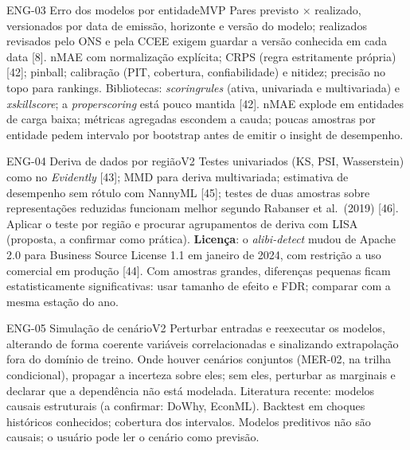 \begin{ficha}{ENG-03 \textperiodcentered{} Erro dos modelos por entidade}{MVP}
 Pares previsto × realizado, versionados por data de emissão,
horizonte e versão do modelo; realizados revisados pelo ONS e pela CCEE
exigem guardar a versão conhecida em cada data [8].
 nMAE com normalização explícita; CRPS (regra estritamente
própria) [42]; pinball; calibração (PIT, cobertura, confiabilidade) e
nitidez; precisão no topo para rankings. Bibliotecas: \emph{scoringrules}
(ativa, univariada e multivariada) e \emph{xskillscore}; a
\emph{properscoring} está pouco mantida [42].
 nMAE explode em entidades de carga baixa; métricas
agregadas escondem a cauda; poucas amostras por entidade pedem intervalo por
bootstrap antes de emitir o insight de desempenho.
\end{ficha}

\begin{ficha}{ENG-04 \textperiodcentered{} Deriva de dados por região}{V2}
 Testes univariados (KS, PSI, Wasserstein) como no
\emph{Evidently} [43]; MMD para deriva multivariada; estimativa de desempenho
sem rótulo com NannyML [45]; testes de duas amostras sobre representações
reduzidas funcionam melhor segundo Rabanser et al.\ (2019) [46]. Aplicar o
teste por região e procurar agrupamentos de deriva com LISA (proposta, a
confirmar como prática).
 \textbf{Licença}: o \emph{alibi-detect} mudou de Apache 2.0
para Business Source License 1.1 em janeiro de 2024, com restrição a uso
comercial em produção [44]. Com amostras grandes, diferenças pequenas ficam estatisticamente
significativas: usar
tamanho de efeito e FDR; comparar com a mesma estação do ano.
\end{ficha}

\begin{ficha}{ENG-05 \textperiodcentered{} Simulação de cenário}{V2}
 Perturbar entradas e reexecutar os modelos, alterando de
forma coerente variáveis correlacionadas e sinalizando extrapolação fora do
domínio de treino. Onde houver cenários conjuntos (MER-02, na trilha
condicional), propagar a incerteza sobre eles; sem eles, perturbar as
marginais e declarar que a dependência não está modelada.
Literatura recente: modelos causais estruturais (a confirmar: DoWhy, EconML).
 Backtest em choques históricos conhecidos; cobertura dos
intervalos.
 Modelos preditivos não são causais; o usuário pode ler o
cenário como previsão.
\end{ficha}


